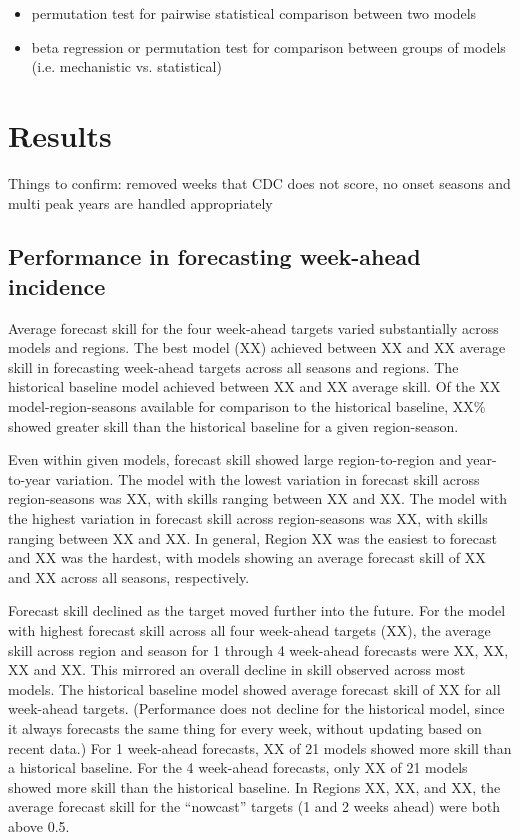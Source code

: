 \documentclass{article}
\begin{document}
\begin{itemize}
    \item permutation test for pairwise statistical comparison between two models
    \item beta regression or permutation test for comparison between groups of models (i.e. mechanistic vs. statistical)
\end{itemize}


\section{Results}

Things to confirm: removed weeks that CDC does not score, no onset seasons and multi peak years are handled appropriately

\subsection{Performance in forecasting week-ahead incidence}

Average forecast skill for the four week-ahead targets varied substantially across models and regions.
The best model (XX) achieved between XX and XX average skill in forecasting week-ahead targets across all seasons and regions.
The historical baseline model achieved between XX and XX average skill.
Of the XX model-region-seasons available for comparison to the historical baseline, XX\% showed greater skill than the historical baseline for a given region-season.


Even within given models, forecast skill showed large region-to-region and year-to-year variation. 
The model with the lowest variation in forecast skill across region-seasons was XX, with skills ranging between XX and XX.
The model with the highest variation in forecast skill across region-seasons was XX, with skills ranging between XX and XX.
In general, Region XX was the easiest to forecast and XX was the hardest, with models showing an average forecast skill of XX and XX across all seasons, respectively.

Forecast skill declined as the target moved further into the future.
For the model with highest forecast skill across all four week-ahead targets (XX), the average skill across region and season for 1 through 4 week-ahead forecasts were XX, XX, XX and XX.
This mirrored an overall decline in skill observed across most models.
The historical baseline model showed average forecast skill of XX for all week-ahead targets. (Performance does not decline for the historical model, since it always forecasts the same thing for every week, without updating based on recent data.)
For 1 week-ahead forecasts, XX of 21 models showed more skill than a historical baseline. 
For the 4 week-ahead forecasts, only XX of 21 models showed more skill than the historical baseline.
In Regions XX, XX, and XX, the average forecast skill for the ``nowcast'' targets (1 and 2 weeks ahead) were both above 0.5.
\end{document}
